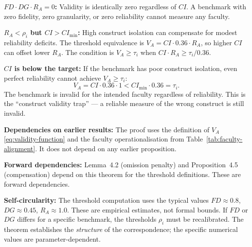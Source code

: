 \begin{boundary-case}
\textbf{$FD \cdot DG \cdot R_A = 0$:}
Validity is identically zero regardless of $CI$. A benchmark with
zero fidelity, zero granularity, or zero reliability cannot measure
any faculty.

\textbf{$R_A < \rho_i$ but $CI > CI_{\min}$:}
High construct isolation can compensate for modest reliability deficits.
The threshold equivalence is $V_A = CI \cdot 0.36 \cdot R_A$, so
higher $CI$ can offset lower $R_A$. The condition is
$V_A \geq \tau_i$ when $CI \cdot R_A \geq \tau_i / 0.36$.

\textbf{$CI$ is below the target:}
If the benchmark has poor construct isolation, even perfect reliability
cannot achieve $V_A \geq \tau_i$:
\[
V_A = CI \cdot 0.36 \cdot 1 < CI_{\min} \cdot 0.36 = \tau_i.
\]
The benchmark is invalid for the intended faculty regardless of
reliability. This is the ``construct validity trap'' — a reliable
measure of the wrong construct is still invalid.
\end{boundary-case}

\begin{circularity-check}
\textbf{Dependencies on earlier results:} The proof uses the
definition of $V_A$ \eqref{eq:validity-function} and the faculty
operationalisation from Table~\ref{tab:faculty-alignment}. It does
not depend on any earlier proposition.

\textbf{Forward dependencies:} Lemma~4.2 (omission penalty) and
Proposition~4.5 (compensation) depend on this theorem for the
threshold definitions. These are forward dependencies.

\textbf{Self-circularity:} The threshold computation uses the
typical values $FD \approx 0.8$, $DG \approx 0.45$, $R_A \approx 1.0$.
These are empirical estimates, not formal bounds. If $FD$ or $DG$
differs for a specific benchmark, the thresholds $\rho_i$ must be
recalibrated. The theorem establishes the \emph{structure} of the
correspondence; the specific numerical values are parameter-dependent.
\end{circularity-check}
